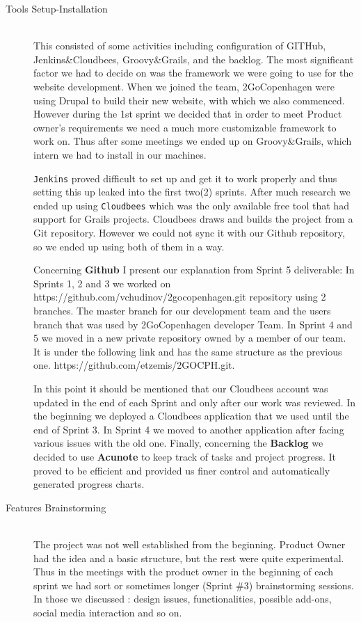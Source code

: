 \begin{description}
  \item[Tools Setup-Installation] \hfill \\
  This consisted of some activities including configuration of GITHub, Jenkins\&Cloudbees, Groovy\&Grails, and the backlog. The most significant factor we had to decide on was the framework we were going to use for the website development. When we joined the team, 2GoCopenhagen were using Drupal to build their new website, with which we also commenced. However during the 1st sprint we decided that in order to meet  Product owner's requirements we need a much more customizable framework to work on. Thus after some meetings we ended up on Groovy\&Grails, which intern we had to install in our machines.
 
\verb|Jenkins| proved difficult to set up and get it to work properly and thus setting this up leaked into the first two(2) sprints. After much research we ended up using \verb|Cloudbees| which was the only available free tool that had support for Grails projects. Cloudbees draws and builds the project from a Git repository. However we could not sync it with our Github repository, so we ended up using both of them in a way.

Concerning \textbf{Github} I present our explanation from Sprint 5 deliverable: In Sprints 1, 2 and 3 we worked on https://github.com/vchudinov/2gocopenhagen.git repository using  2 branches. The master branch for our development team and the users branch that was used by 2GoCopenhagen developer Team.
In Sprint 4 and 5 we moved in a new private repository owned by a member of our team. It is under the following link and has the same structure as the previous one. https://github.com/etzemis/2GOCPH.git. 

In this point it should be mentioned that our Cloudbees account was updated in the end of each Sprint and only after our work was reviewed. In the beginning we deployed a Cloudbees application that we used until the end of Sprint 3. In Sprint 4 we moved to another application after facing various issues with the old one. 
Finally, concerning the \textbf{Backlog} we decided to use \textbf{Acunote} to keep track of tasks and project progress. It proved to be efficient and provided us finer control and automatically generated progress charts.
   
  \item[Features Brainstorming] \hfill \\
  The project was not well established from the beginning. Product Owner had the idea and a basic structure, but the rest were quite experimental. Thus in the meetings 
  with the product owner in the beginning of each sprint we had sort or sometimes longer (Sprint \#3) brainstorming sessions. In those we discussed : design issues, functionalities, possible add-ons, social media interaction and so on. 
  

\end{description}
